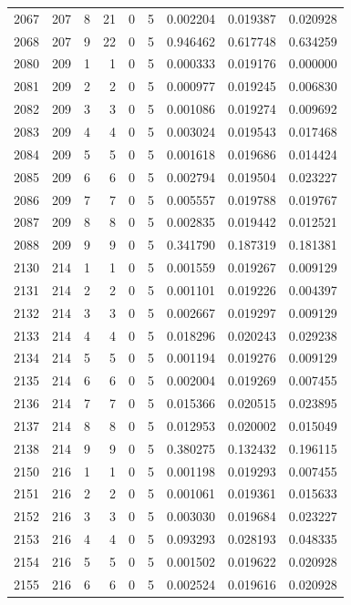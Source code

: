 \begin{longtable}{rrrrrrrrr}
2067 & 207 & 8 & 21 & 0 & 5 & 0.002204 & 0.019387 & 0.020928 \\
2068 & 207 & 9 & 22 & 0 & 5 & 0.946462 & 0.617748 & 0.634259 \\
2080 & 209 & 1 & 1 & 0 & 5 & 0.000333 & 0.019176 & 0.000000 \\
2081 & 209 & 2 & 2 & 0 & 5 & 0.000977 & 0.019245 & 0.006830 \\
2082 & 209 & 3 & 3 & 0 & 5 & 0.001086 & 0.019274 & 0.009692 \\
2083 & 209 & 4 & 4 & 0 & 5 & 0.003024 & 0.019543 & 0.017468 \\
2084 & 209 & 5 & 5 & 0 & 5 & 0.001618 & 0.019686 & 0.014424 \\
2085 & 209 & 6 & 6 & 0 & 5 & 0.002794 & 0.019504 & 0.023227 \\
2086 & 209 & 7 & 7 & 0 & 5 & 0.005557 & 0.019788 & 0.019767 \\
2087 & 209 & 8 & 8 & 0 & 5 & 0.002835 & 0.019442 & 0.012521 \\
2088 & 209 & 9 & 9 & 0 & 5 & 0.341790 & 0.187319 & 0.181381 \\
2130 & 214 & 1 & 1 & 0 & 5 & 0.001559 & 0.019267 & 0.009129 \\
2131 & 214 & 2 & 2 & 0 & 5 & 0.001101 & 0.019226 & 0.004397 \\
2132 & 214 & 3 & 3 & 0 & 5 & 0.002667 & 0.019297 & 0.009129 \\
2133 & 214 & 4 & 4 & 0 & 5 & 0.018296 & 0.020243 & 0.029238 \\
2134 & 214 & 5 & 5 & 0 & 5 & 0.001194 & 0.019276 & 0.009129 \\
2135 & 214 & 6 & 6 & 0 & 5 & 0.002004 & 0.019269 & 0.007455 \\
2136 & 214 & 7 & 7 & 0 & 5 & 0.015366 & 0.020515 & 0.023895 \\
2137 & 214 & 8 & 8 & 0 & 5 & 0.012953 & 0.020002 & 0.015049 \\
2138 & 214 & 9 & 9 & 0 & 5 & 0.380275 & 0.132432 & 0.196115 \\
2150 & 216 & 1 & 1 & 0 & 5 & 0.001198 & 0.019293 & 0.007455 \\
2151 & 216 & 2 & 2 & 0 & 5 & 0.001061 & 0.019361 & 0.015633 \\
2152 & 216 & 3 & 3 & 0 & 5 & 0.003030 & 0.019684 & 0.023227 \\
2153 & 216 & 4 & 4 & 0 & 5 & 0.093293 & 0.028193 & 0.048335 \\
2154 & 216 & 5 & 5 & 0 & 5 & 0.001502 & 0.019622 & 0.020928 \\
2155 & 216 & 6 & 6 & 0 & 5 & 0.002524 & 0.019616 & 0.020928 \\

\end{longtable}
